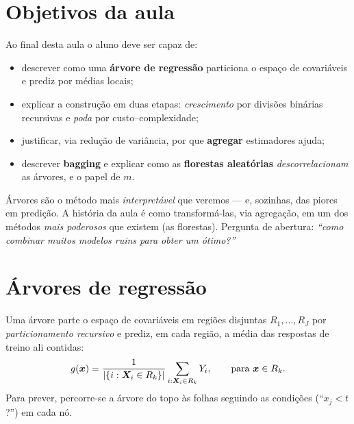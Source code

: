\documentclass[11pt,a4paper]{article}
\begin{document}

\section*{Objetivos da aula}
Ao final desta aula o aluno deve ser capaz de:
\begin{itemize}[leftmargin=1.4cm]
  \item descrever como uma \textbf{árvore de regressão} particiona o espaço de
        covariáveis e prediz por médias locais;
  \item explicar a construção em duas etapas: \emph{crescimento} por divisões
        binárias recursivas e \emph{poda} por custo--complexidade;
  \item justificar, via redução de variância, por que \textbf{agregar} estimadores
        ajuda;
  \item descrever \textbf{bagging} e explicar como as \textbf{florestas
        aleatórias} \emph{descorrelacionam} as árvores, e o papel de $m$.
\end{itemize}

\begin{emsala}
Árvores são o método mais \emph{interpretável} que veremos --- e, sozinhas, das
piores em predição. A história da aula é como transformá-las, via agregação, em
um dos métodos \emph{mais poderosos} que existem (as florestas). Pergunta de
abertura: \emph{``como combinar muitos modelos ruins para obter um ótimo?''}
\end{emsala}

\section{Árvores de regressão}
Uma árvore parte o espaço de covariáveis em regiões disjuntas $R_1,\dots,R_J$ por
\emph{particionamento recursivo} e prediz, em cada região, a média das respostas de
treino ali contidas:
\begin{equation}\label{eq:arvore}
  g(\bm{x}) = \frac{1}{\left\lvert \{i:\bm{X}_i\in R_k\} \right\rvert}\sum_{i:\bm{X}_i\in R_k} Y_i,
  \qquad \text{para } \bm{x}\in R_k .
\end{equation}
Para prever, percorre-se a árvore do topo às folhas seguindo as condições
(``$x_j<t$?'') em cada nó.
\end{document}
